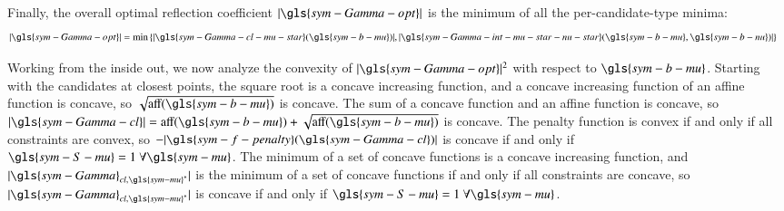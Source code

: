 Finally, the overall optimal reflection coefficient $|\gls{sym-Gamma-opt}|$ is the minimum of all the per-candidate-type minima:
\begin{equation}\label{eq:gamma-opt-min}
\begin{aligned}
    |\gls{sym-Gamma-opt}| &=
    \min \left\{
        |\gls{sym-Gamma-cl-mu-star} (\gls{sym-b-mu}) |, 
        |\gls{sym-Gamma-int-mu-star-nu-star} (\gls{sym-b-mu}, \gls{sym-b-nu})|
    \right\}
\end{aligned}
\end{equation}

Working from the inside out, we now analyze the convexity of $|\gls{sym-Gamma-opt}|^2$ with respect to $\gls{sym-b-mu}$.
Starting with the candidates at closest points, the square root is a concave increasing function,
and a concave increasing function of an affine function is concave,
so $\sqrt{\textrm{aff}(\gls{sym-b-mu})}$ is concave.
The sum of a concave function and an affine function is concave,
so $|\gls{sym-Gamma-cl}|=\textrm{aff}(\gls{sym-b-mu}) + \sqrt{\textrm{aff}(\gls{sym-b-mu})}$ is concave.
The penalty function is convex if and only if all constraints are convex,
so $-|\gls{sym-f-penalty}(\gls{sym-Gamma-cl})|$
is concave if and only if
$\gls{sym-S-mu}=1 ~\forall \gls{sym-mu}$.
The minimum of a set of concave functions is a concave increasing function,
and $|\gls{sym-Gamma}_{cl,\gls{sym-mu}^*}|$
is the minimum of a set of concave functions if and only if all constraints are concave,
so $|\gls{sym-Gamma}_{cl,\gls{sym-mu}^*}|$
is concave if and only if
$\gls{sym-S-mu}=1 ~\forall \gls{sym-mu}$.

